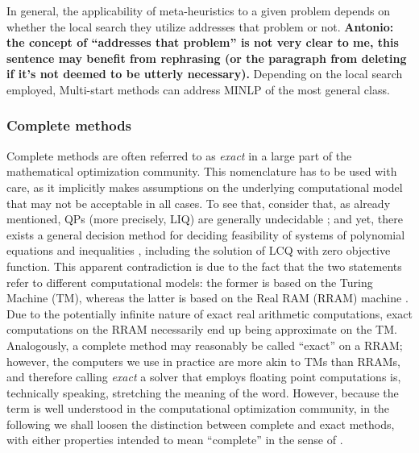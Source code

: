 In general, the applicability of meta-heuristics to a given problem depends 
on whether the local search they utilize
addresses that problem or not. 
{\bf Antonio: the concept of ``addresses that problem'' is not very clear to me, this sentence may benefit from rephrasing (or the paragraph from deleting if it's not deemed to be utterly necessary).} Depending on the local search employed, Multi-start methods can address MINLP of the most general class.

\subsubsection{Complete methods}\label{s:complete}

Complete methods are often referred to as \emph{exact} in a large part of the mathematical optimization community. This nomenclature has to be used with care, as it implicitly makes assumptions on the underlying computational model that may not be acceptable in all cases. To see that, consider that, as already mentioned, QPs (more precisely, LIQ) are generally undecidable \cite{jeroslow}; and yet, there exists a general decision method for deciding feasibility of systems of polynomial equations and inequalities \cite{tarski-reals}, including the solution of LCQ with zero objective function. This apparent contradiction is due to the fact that the two statements refer to different computational models: the former is based on the Turing Machine (TM), whereas the latter is based on the Real RAM (RRAM) machine \cite{blum}. Due to the potentially infinite nature of exact real arithmetic computations, exact computations on the RRAM necessarily end up being approximate on the TM. Analogously, a complete method may reasonably be called ``exact'' on a RRAM; however, the computers we use in practice are more akin to TMs than RRAMs, and therefore 
calling \emph{exact} a solver that employs
floating point computations is, technically speaking, stretching the meaning of the word. However, because the term is well understood in the computational optimization community, in the following we shall loosen the distinction between complete and exact methods, with either properties intended to mean ``complete'' in the sense of \cite{neumaier}.

